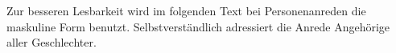 
\thispagestyle{empty}
\section*{}

Zur besseren Lesbarkeit wird im folgenden Text bei Personenanreden die maskuline Form benutzt. Selbstverständlich adressiert die Anrede Angehörige aller Geschlechter.
